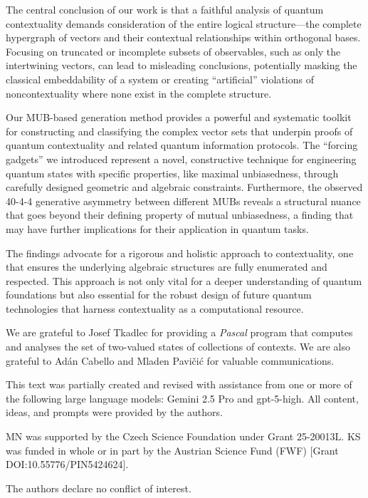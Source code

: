 \documentclass[%
  reprint,
  superscriptaddress,
  showpacs,
  showkeys,
  amsmath,amssymb,
  pra,
  longbibliography,
  floatfix,
  x11names
]{revtex4-2}
\begin{document}
The central conclusion of our work is that a faithful analysis of quantum contextuality demands consideration of the entire logical structure---the complete hypergraph of vectors and their contextual relationships within orthogonal bases. Focusing on truncated or incomplete subsets of observables, such as only the intertwining vectors, can lead to misleading conclusions, potentially masking the classical embeddability of a system or creating ``artificial'' violations of noncontextuality where none exist in the complete structure.

Our MUB-based generation method provides a powerful and systematic toolkit for constructing and classifying the complex vector sets that underpin proofs of quantum contextuality and related quantum information protocols. The ``forcing gadgets'' we introduced represent a novel, constructive technique for engineering quantum states with specific properties, like maximal unbiasedness, through carefully designed geometric and algebraic constraints. Furthermore, the observed 40-4-4 generative asymmetry between different MUBs reveals a structural nuance that goes beyond their defining property of mutual unbiasedness, a finding that may have further implications for their application in quantum tasks.

The findings advocate for a rigorous and holistic approach to contextuality, one that ensures the underlying algebraic structures are fully enumerated and respected. This approach is not only vital for a deeper understanding of quantum foundations but also essential for the robust design of future quantum technologies that harness contextuality as a computational resource.

\begin{acknowledgments}
We are grateful to Josef Tkadlec for providing a {\em Pascal} program that computes and analyses the set of two-valued states of collections of contexts.
We are also grateful to Ad\'{a}n Cabello and Mladen Pavi{\v{c}}i{\'{c}} for valuable communications.

This text was partially created and revised with assistance from one or more of the following large language models:  Gemini 2.5 Pro
and gpt-5-high. All content, ideas, and prompts were provided by the authors.

MN was supported by the Czech Science Foundation under Grant 25-20013L.
KS was funded in whole or in part by the Austrian Science Fund (FWF) [Grant DOI:10.55776/PIN5424624].

The authors declare no conflict of interest.
\end{acknowledgments}
\end{document}
